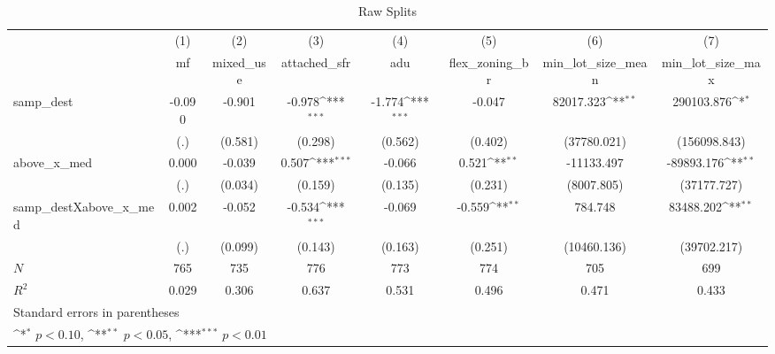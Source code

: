 \begin{table}[htbp]\centering
\def\sym#1{\ifmmode^{#1}\else\(^{#1}\)\fi}
\caption{Raw Splits}
\begin{tabular}{l*{7}{c}}
\hline\hline
            &\multicolumn{1}{c}{(1)}&\multicolumn{1}{c}{(2)}&\multicolumn{1}{c}{(3)}&\multicolumn{1}{c}{(4)}&\multicolumn{1}{c}{(5)}&\multicolumn{1}{c}{(6)}&\multicolumn{1}{c}{(7)}\\
            &\multicolumn{1}{c}{mf}&\multicolumn{1}{c}{mixed\_use}&\multicolumn{1}{c}{attached\_sfr}&\multicolumn{1}{c}{adu}&\multicolumn{1}{c}{flex\_zoning\_br}&\multicolumn{1}{c}{min\_lot\_size\_mean}&\multicolumn{1}{c}{min\_lot\_size\_max}\\
\hline
samp\_dest   &      -0.090         &      -0.901         &      -0.978\sym{***}&      -1.774\sym{***}&      -0.047         &   82017.323\sym{**} &  290103.876\sym{*}  \\
            &         (.)         &     (0.581)         &     (0.298)         &     (0.562)         &     (0.402)         & (37780.021)         &(156098.843)         \\
[1em]
above\_x\_med &       0.000         &      -0.039         &       0.507\sym{***}&      -0.066         &       0.521\sym{**} &  -11133.497         &  -89893.176\sym{**} \\
            &         (.)         &     (0.034)         &     (0.159)         &     (0.135)         &     (0.231)         &  (8007.805)         & (37177.727)         \\
[1em]
samp\_destXabove\_x\_med&       0.002         &      -0.052         &      -0.534\sym{***}&      -0.069         &      -0.559\sym{**} &     784.748         &   83488.202\sym{**} \\
            &         (.)         &     (0.099)         &     (0.143)         &     (0.163)         &     (0.251)         & (10460.136)         & (39702.217)         \\
\hline
\(N\)       &         765         &         735         &         776         &         773         &         774         &         705         &         699         \\
\(R^{2}\)   &       0.029         &       0.306         &       0.637         &       0.531         &       0.496         &       0.471         &       0.433         \\
\hline\hline
\multicolumn{8}{l}{\footnotesize Standard errors in parentheses}\\
\multicolumn{8}{l}{\footnotesize \sym{*} \(p<0.10\), \sym{**} \(p<0.05\), \sym{***} \(p<0.01\)}\\
\end{tabular}
\end{table}

